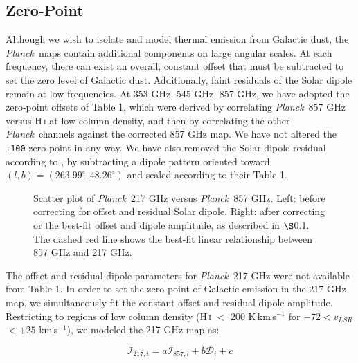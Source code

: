 \documentclass{emulateapj}
\newcommand{\PLANCK}{{\it Planck}}
\begin{document}
\subsection{Zero-Point}
\label{sec:zp}
Although we wish to isolate and model thermal emission from Galactic dust, the
\PLANCK~maps contain additional components on large angular scales. At each 
frequency, there can exist an overall, constant offset that must be subtracted 
to set the zero level of Galactic dust. Additionally, faint residuals of the 
Solar dipole remain at low frequencies. At 353 GHz, 545 GHz, 857 GHz, we have 
adopted the zero-point offsets of \cite{planckdust} Table 1, which were derived
 by correlating \PLANCK~857 GHz versus H\,\textsc{i} at low column density, and
then by correlating the other \PLANCK~channels against the corrected 857 GHz 
map. We have not altered the \verb|i100| zero-point in any way. We have also 
removed the Solar dipole residual according to \cite{planckdust}, by 
subtracting a dipole pattern oriented toward 
$(l, b) = (263.99^{\circ}, 48.26^{\circ})$ and scaled according to their 
Table 1.

\begin{figure}
\begin{center}
\caption{\label{fig:scatter} Scatter plot of \PLANCK~217 GHz versus \PLANCK~857
GHz. Left: before correcting for offset and residual Solar dipole. Right: after
correcting or the best-fit offset and dipole amplitude, as described in 
$\S$\ref{sec:zp}. The dashed red line shows the best-fit linear relationship
between 857 GHz and 217 GHz.}
\end{center}
\end{figure}

The offset and residual dipole parameters for \PLANCK~217 GHz were not 
available from \cite{planckdust} Table 1. In order to set the zero-point of 
Galactic emission in the 217 GHz map, we simultaneously fit the constant 
offset and residual dipole amplitude. Restricting to regions of low column 
density (H\,\textsc{i} $<$ 200 K\,km\,s$^{-1}$ for $-72$$<$$v_{LSR}$$<$$+25$ 
km\,s$^{-1}$), we modeled the 217 GHz map as:

\begin{equation}
\mathcal{I}_{217, i} = a\mathcal{I}_{857, i} + b\mathcal{D}_{i} + c
\end{equation}
\end{document}
